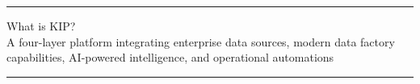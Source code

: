 \documentclass[12pt, a4paper]{article}
\begin{document}
 \newpage

 
 \begin{center}
     \noindent\rule{\linewidth}{2pt}
     
    \vspace{0.15em}
    
    {\Large What is KIP?} \\[0.2em]
    {\small A four-layer platform integrating enterprise data sources, modern data factory capabilities, AI-powered intelligence, and operational automations}
    
    \vspace{0.15em}
     
     \noindent\rule{\linewidth}{2pt}
\end{center}

\vspace{0.1em}
\end{document}
